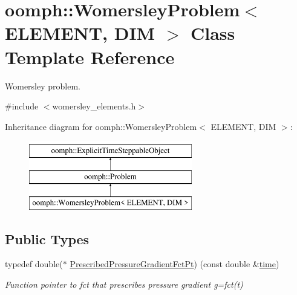 \hypertarget{classoomph_1_1WomersleyProblem}{}\section{oomph\+:\+:Womersley\+Problem$<$ E\+L\+E\+M\+E\+NT, D\+IM $>$ Class Template Reference}
\label{classoomph_1_1WomersleyProblem}


Womersley problem.  




{\ttfamily \#include $<$womersley\+\_\+elements.\+h$>$}

Inheritance diagram for oomph\+:\+:Womersley\+Problem$<$ E\+L\+E\+M\+E\+NT, D\+IM $>$\+:\begin{figure}[H]
\begin{center}
\leavevmode
\includegraphics[height=3.000000cm]{classoomph_1_1WomersleyProblem}
\end{center}
\end{figure}
\subsection*{Public Types}
\begin{DoxyCompactItemize}
\item 
typedef double($\ast$ \hyperlink{classoomph_1_1WomersleyProblem_ac3607d12a92dede9ed2e93ae64f300b3}{Prescribed\+Pressure\+Gradient\+Fct\+Pt}) (const double \&\hyperlink{classoomph_1_1Problem_acd8c357349d20a28af70b2b7ea7f488d}{time})
\begin{DoxyCompactList}\small\item\em Function pointer to fct that prescribes pressure gradient g=fct(t) \end{DoxyCompactList}\end{DoxyCompactItemize}
